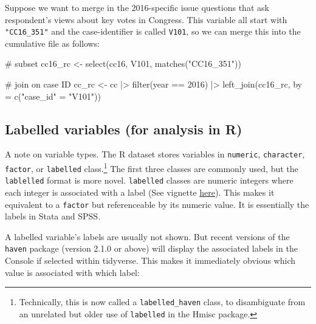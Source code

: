 \documentclass[10pt,article,oneside]{memoir}
\newenvironment{Shaded}{\begin{snugshade}}{\end{snugshade}}
\newcommand{\AttributeTok}[1]{\textcolor[rgb]{0.40,0.45,0.13}{#1}}
\newcommand{\CommentTok}[1]{\textcolor[rgb]{0.37,0.37,0.37}{#1}}
\newcommand{\DecValTok}[1]{\textcolor[rgb]{0.68,0.00,0.00}{#1}}
\newcommand{\FunctionTok}[1]{\textcolor[rgb]{0.28,0.35,0.67}{#1}}
\newcommand{\NormalTok}[1]{\textcolor[rgb]{0.00,0.23,0.31}{#1}}
\newcommand{\OtherTok}[1]{\textcolor[rgb]{0.00,0.23,0.31}{#1}}
\newcommand{\SpecialCharTok}[1]{\textcolor[rgb]{0.37,0.37,0.37}{#1}}
\newcommand{\StringTok}[1]{\textcolor[rgb]{0.13,0.47,0.30}{#1}}
\begin{document}
Suppose we want to merge in the 2016-specific issue questions that ask
respondent's views about key votes in Congress. This variable all start
with \texttt{"CC16\_351"} and the case-identifier is called
\texttt{V101}, so we can merge this into the cumulative file as follows:

\begin{Shaded}
\begin{Highlighting}[]
\CommentTok{\# subset}
\NormalTok{cc16\_rc }\OtherTok{\textless{}{-}} \FunctionTok{select}\NormalTok{(cc16, V101, }\FunctionTok{matches}\NormalTok{(}\StringTok{"CC16\_351"}\NormalTok{))}

\CommentTok{\# join on case ID}
\NormalTok{cc\_rc }\OtherTok{\textless{}{-}}\NormalTok{ cc }\SpecialCharTok{|\textgreater{}} 
  \FunctionTok{filter}\NormalTok{(year }\SpecialCharTok{==} \DecValTok{2016}\NormalTok{) }\SpecialCharTok{|\textgreater{}} 
  \FunctionTok{left\_join}\NormalTok{(cc16\_rc, }\AttributeTok{by =} \FunctionTok{c}\NormalTok{(}\StringTok{"case\_id"} \OtherTok{=} \StringTok{"V101"}\NormalTok{))}
\end{Highlighting}
\end{Shaded}

\subsection{Labelled variables (for analysis in
R)}\label{labelled-variables-for-analysis-in-r}

A note on variable types. The R dataset stores variables in
\texttt{numeric}, \texttt{character}, \texttt{factor}, or
\texttt{labelled} class.\footnote{Technically, this is now called a
  \texttt{labelled\_haven} class, to disambiguate from an unrelated but
  older use of \texttt{labelled} in the Hmisc package.} The first three
classes are commonly used, but the \texttt{lablelled} format is more
novel. \texttt{labelled} classes are numeric integers where each integer
is associated with a label (See vignette
\href{https://cran.r-project.org/web/packages/labelled/vignettes/intro_labelled.html}{here}).
This makes it equivalent to a \texttt{factor} but referenceable by its
numeric value. It is essentially the labels in Stata and SPSS.

A labelled variable's labels are usually not shown. But recent versions
of the \texttt{haven} package (version 2.1.0 or above) will display the
associated labels in the Console if selected within tidyverse. This
makes it immediately obvious which value is associated with which label:
\end{document}
